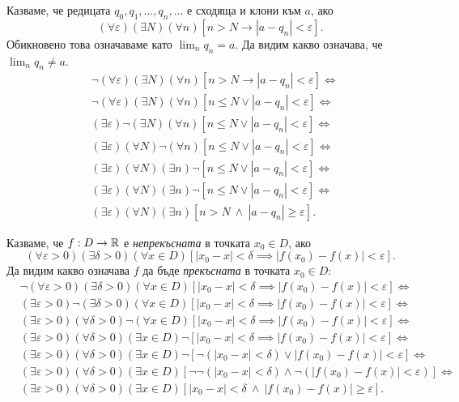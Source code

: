 \begin{example}
  Казваме, че редицата $q_0,q_1,\dots,q_n,\dots$ е сходяща и клони към $a$, ако
  \[(\forall \varepsilon)(\exists N)(\forall n)[n > N \to |a - q_n| < \varepsilon].\]
  Обикновено това означаваме като $\lim_n q_n = a$.
  Да видим какво означава, че $\lim_n q_n \neq a$.
  \begin{align*}
    & \neg (\forall \varepsilon)(\exists N)(\forall n)[n > N \to |a - q_n| < \varepsilon] \iff \\
    & \neg (\forall \varepsilon)(\exists N)(\forall n)[n \leq N \vee |a - q_n| < \varepsilon] \iff \\
    & (\exists \varepsilon) \neg (\exists N)(\forall n)[n \leq N \vee |a - q_n| < \varepsilon] \iff \\
    & (\exists \varepsilon) (\forall N) \neg (\forall n)[n \leq N \vee |a - q_n| < \varepsilon] \iff \\
    & (\exists \varepsilon) (\forall N)(\exists n)\neg[n \leq N \vee |a - q_n| < \varepsilon] \iff \\
    & (\exists \varepsilon) (\forall N)(\exists n)\neg[n \leq N \vee |a - q_n| < \varepsilon] \iff \\
    & (\exists \varepsilon) (\forall N)(\exists n)[n > N\ \wedge\ |a - q_n| \geq \varepsilon].
  \end{align*}
\end{example}


\begin{example}
  Казваме, че $f:D \to \mathbb{R}$ е {\em непрекъсната} в точката $x_0 \in D$, ако 
  \[(\forall \varepsilon > 0)(\exists \delta >0)(\forall x\in D)[|x_0 - x| < \delta \implies |f(x_0) - f(x)| < \varepsilon].\]
  Да видим какво означава $f$ да бъде {\em прекъсната} в точката $x_0 \in D$:
  \begin{align*}
    & \neg (\forall \varepsilon > 0)(\exists \delta >0)(\forall x\in D)[|x_0 - x| < \delta \implies |f(x_0) - f(x)| < \varepsilon] \iff\\
    & (\exists \varepsilon > 0) \neg (\exists \delta >0)(\forall x\in D)[|x_0 - x| < \delta \implies |f(x_0) - f(x)| < \varepsilon] \iff \\
    & (\exists \varepsilon > 0)(\forall \delta >0)\neg(\forall x\in D)[|x_0 - x| < \delta \implies |f(x_0) - f(x)| < \varepsilon] \iff \\
    & (\exists \varepsilon > 0)(\forall \delta >0)(\exists x\in D)\neg[|x_0 - x| < \delta \implies |f(x_0) - f(x)| < \varepsilon] \iff \\
    & (\exists \varepsilon > 0)(\forall \delta >0)(\exists x\in D)\neg[\neg (|x_0 - x| <\delta) \vee |f(x_0) - f(x)| < \varepsilon] \iff \\
    & (\exists \varepsilon > 0)(\forall \delta >0)(\exists x\in D)[\neg\neg (|x_0 - x| <\delta) \land \neg (|f(x_0) - f(x)| < \varepsilon)] \iff \\
    & (\exists \varepsilon > 0)(\forall \delta >0)(\exists x\in D)[|x_0 - x| < \delta\ \land\ |f(x_0) - f(x)| \geq \varepsilon].
  \end{align*}
\end{example}

